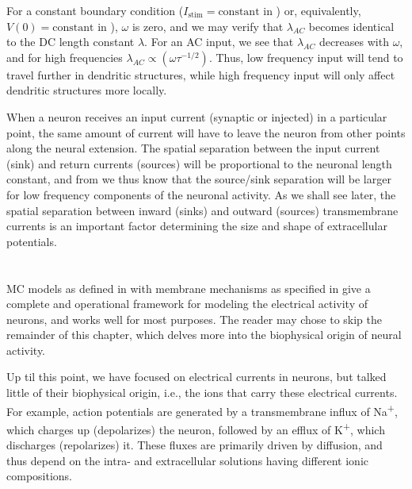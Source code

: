 For a constant boundary condition ($I_\text{stim} = \text{constant}$ in ) or, equivalently, $V(0) = \text{constant}$ in ), $\omega$ is zero, and we may verify that $\lambda_{AC}$ becomes identical to the DC length constant $\lambda$. For an AC input, we see that $\lambda_{AC}$ decreases with $\omega$, and for high frequencies $\lambda_{AC} \propto (\omega \tau^{-1/2})$. Thus, low frequency input will tend to travel further in dendritic structures, while high frequency input will only affect dendritic structures more locally. 

When a neuron receives an input current (synaptic or injected) in a particular point, the same amount of current will have to leave the neuron from other points along the neural extension. The spatial separation between the input current (sink) and return currents (sources) will be proportional to the neuronal length constant, and from  we thus know that the source/sink separation will be larger for low frequency components of the neuronal activity. As we shall see later, the spatial separation between inward (sinks) and outward (sources) transmembrane currents is an important factor determining the size and shape of extracellular potentials. 





\section{}
\label{sec:Neuron:Ions_and_reversals}
MC models as defined in  with membrane mechanisms as specified in  give a complete and operational framework for modeling the electrical activity of neurons, and works well for most purposes. The reader may chose to skip the remainder of this chapter, which delves more into the biophysical origin of neural activity. 

Up til this point, we have focused on electrical currents in neurons, but talked little of their biophysical origin, i.e., the ions that carry these electrical currents. For example, action potentials are generated by a transmembrane influx of Na\textsuperscript{+}, which charges up (depolarizes) the neuron, followed by an efflux of K\textsuperscript{+}, which discharges (repolarizes) it. These fluxes are primarily driven by diffusion, and thus depend on the intra- and extracellular solutions having different ionic compositions. 

